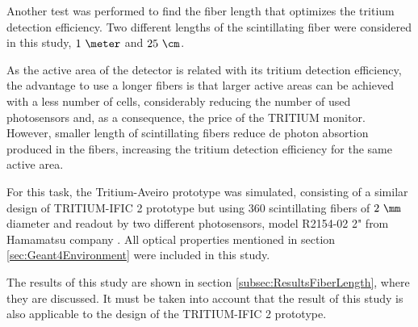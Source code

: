 Another test was performed to find the fiber length that optimizes the tritium detection efficiency. Two different lengths of the scintillating fiber were considered in this study, $1~\meter$ and $25~\cm$. 

As the active area of the detector is related with its tritium detection efficiency, the advantage to use a longer fibers is that larger active areas can be achieved with a less number of cells, considerably reducing the number of used photosensors and, as a consequence, the price of the TRITIUM monitor. However, smaller length of scintillating fibers reduce de photon absortion produced in the fibers, increasing the tritium detection efficiency for the same active area.

For this task, the Tritium-Aveiro prototype was simulated, consisting of a similar design of TRITIUM-IFIC 2 prototype but using $360$ scintillating fibers of $2~\mm$ diameter and readout by two different photosensors, model R2154-02 2" from Hamamatsu company \cite{DataSheetPMTsAveiro}. All optical properties mentioned in section \ref{sec:Geant4Environment} were included in this study.

The results of this study are shown in section \ref{subsec:ResultsFiberLength}, where they are discussed. It must be taken into account that the result of this study is also applicable to the design of the TRITIUM-IFIC 2 prototype.